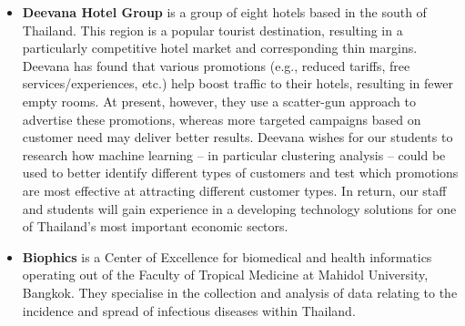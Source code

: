 \documentclass[11pt]{article}
\begin{document}
\begin{itemize}
  \item {\bf Deevana Hotel Group} is a group of eight hotels based in the south of Thailand. This region is a popular tourist destination, resulting in a particularly competitive hotel market and corresponding thin margins. Deevana has found that various promotions (e.g., reduced tariffs, free services/experiences, etc.) help boost traffic to their hotels, resulting in fewer empty rooms. At present, however, they use a scatter-gun approach to advertise these promotions, whereas more targeted campaigns based on customer need may deliver better results. Deevana wishes for our students to research how machine learning -- in particular clustering analysis -- could be used to better identify different types of customers and test which promotions are most effective at attracting different customer types. In return, our staff and students will gain experience in a developing technology solutions for one of Thailand's most important economic sectors.
  \item {\bf Biophics} is a Center of Excellence for biomedical and health informatics operating out of the Faculty of Tropical Medicine at Mahidol University, Bangkok. They specialise in the collection and analysis of data relating to the incidence and spread of infectious diseases within Thailand. 
\end{itemize}
\end{document}
